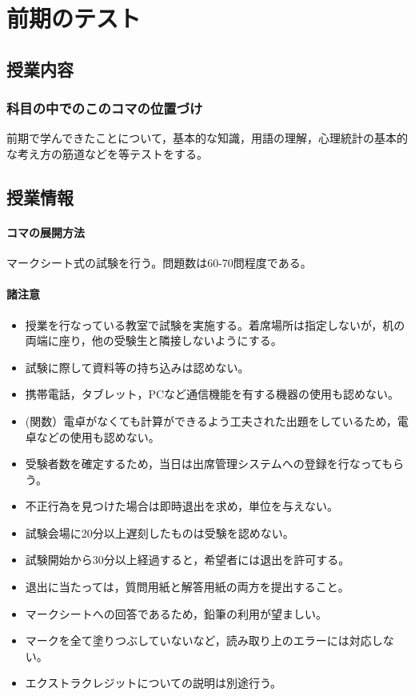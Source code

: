 \section{前期のテスト}
\label{lesson15}

\subsection{授業内容}
\subsubsection{科目の中でのこのコマの位置づけ}
前期で学んできたことについて，基本的な知識，用語の理解，心理統計の基本的な考え方の筋道などを等テストをする。
\subsection{授業情報}
\paragraph{コマの展開方法}
マークシート式の試験を行う。問題数は60-70問程度である。
\paragraph{諸注意}
\begin{itemize}
    \item 授業を行なっている教室で試験を実施する。着席場所は指定しないが，机の両端に座り，他の受験生と隣接しないようにする。
    \item 試験に際して資料等の持ち込みは認めない。
    \item 携帯電話，タブレット，PCなど通信機能を有する機器の使用も認めない。
    \item (関数）電卓がなくても計算ができるよう工夫された出題をしているため，電卓などの使用も認めない。
    \item 受験者数を確定するため，当日は出席管理システムへの登録を行なってもらう。
    \item 不正行為を見つけた場合は即時退出を求め，単位を与えない。
    \item 試験会場に20分以上遅刻したものは受験を認めない。
    \item 試験開始から30分以上経過すると，希望者には退出を許可する。
    \item 退出に当たっては，質問用紙と解答用紙の両方を提出すること。
    \item マークシートへの回答であるため，鉛筆の利用が望ましい。
    \item マークを全て塗りつぶしていないなど，読み取り上のエラーには対応しない。
    \item エクストラクレジットについての説明は別途行う。
\end{itemize}
